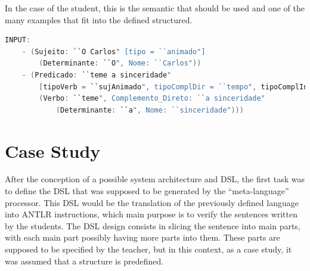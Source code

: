 
In the case of the student, this is the semantic that should be used and one of the many examples that fit into the defined structured.

\begin{center}
\begin{minipage}{13cm}
\begin{lstlisting}[language=java, basicstyle=\tiny, label={lst:meta_input}, caption=Example of the students parsing]
INPUT:
    - (Sujeito: ``O Carlos" [tipo = ``animado"]
        (Determinante: ``O", Nome: ``Carlos"))
    - (Predicado: ``teme a sinceridade" 
        [tipoVerb = ``sujAnimado", tipoComplDir = ``tempo", tipoComplInd = ``null"]
        (Verbo: ``teme", Complemento_Direto: ``a sinceridade" 
            (Determinante: ``a", Nome: ``sinceridade")))
\end{lstlisting}
\end{minipage}
\end{center}



\newpage
\section{Case Study}
After the conception of a possible system architecture and DSL, the first task was to define the \textsc{DSL} that was supposed to be generated by the ``meta-language'' processor. This \textsc{DSL} would be the translation of the previously defined language into \textsc{ANTLR} instructions, which main purpose is to verify the sentences written by the students. The \textsc{DSL} design consists in slicing the sentence into main parts, with each main part possibly having more parts into them. These parts are supposed to be specified by the teacher, but in this context, as a case study, it was assumed that a structure is predefined.

